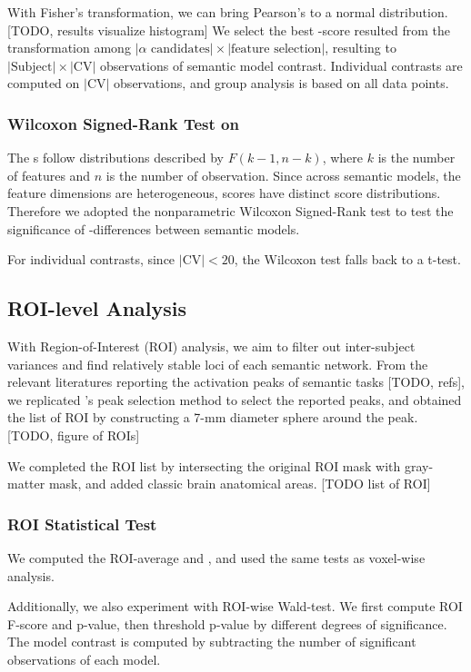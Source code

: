 With Fisher's transformation, we can bring Pearson's  to a normal distribution. [TODO, results visualize histogram] We select the best -score resulted from the transformation among \( \lvert \alpha \text{ candidates} \rvert \times \lvert \text{feature selection}  \rvert \), resulting to \( \lvert \text{Subject} \rvert \times \lvert \text{CV} \rvert \) observations of semantic model contrast. Individual contrasts are computed on \(\lvert \text{CV} \rvert \) observations, and group analysis is based on all data points.

\subsubsection{Wilcoxon Signed-Rank Test on }

The s follow distributions described by \(F(k-1, n-k)\), where \(k\) is the number of features and \(n\) is the number of observation. Since across semantic models, the feature dimensions are heterogeneous,  scores have distinct score distributions. Therefore we adopted the nonparametric Wilcoxon Signed-Rank test to test the significance of -differences between semantic models. 

For individual contrasts, since \(\lvert \text{CV} \rvert < 20\), the Wilcoxon test falls back to a t-test.

\subsection{ROI-level Analysis}

With Region-of-Interest (ROI) analysis, we aim to filter out inter-subject variances and find relatively stable loci of each semantic network. From the relevant literatures reporting the activation peaks of semantic tasks [TODO, refs], we replicated \cite{pattersonWhereYouKnow2007}'s peak selection method to select the reported peaks,
and obtained the list of ROI by constructing a 7-mm diameter sphere around the peak. [TODO, figure of ROIs]

We completed the ROI list by intersecting the original ROI mask with gray-matter mask, and added classic brain anatomical areas. [TODO list of ROI]

\subsubsection{ROI Statistical Test}
We computed the ROI-average  and , and used the same tests as voxel-wise analysis. 

Additionally, we also experiment with ROI-wise Wald-test. We first compute ROI F-score and p-value, then threshold p-value by different degrees of significance. The model contrast is computed by subtracting the number of significant observations of each model.